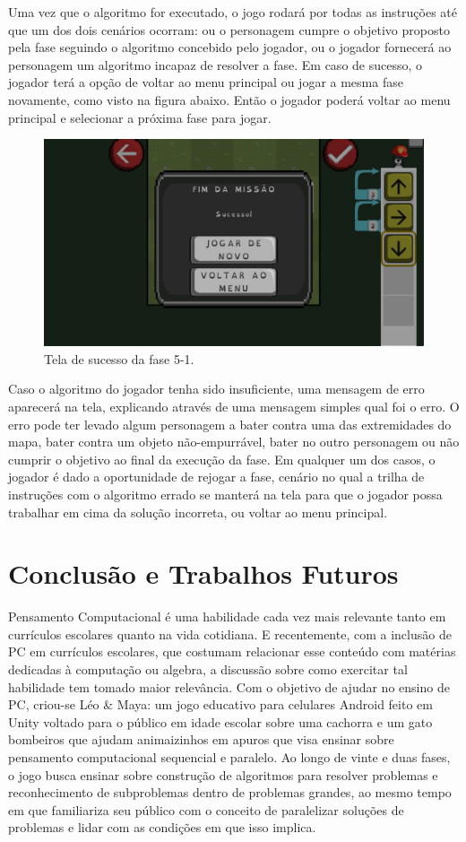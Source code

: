 \documentclass[conference]{IEEEtran}
\begin{document}
Uma vez que o algoritmo for executado, o jogo rodará por todas as instruções até que um dos dois cenários ocorram: ou o personagem cumpre o objetivo proposto pela fase seguindo o algoritmo concebido pelo jogador, ou o jogador fornecerá ao personagem um algoritmo incapaz de resolver a fase. Em caso de sucesso, o jogador terá a opção de voltar ao menu principal ou jogar a mesma fase novamente, como visto na figura abaixo. Então o jogador poderá voltar ao menu principal e selecionar a próxima fase para jogar.
\begin{figure}[htbp]
\centerline{\includegraphics[scale=0.275]{images/fig03.jpg}}
\caption{Tela de sucesso da fase 5-1.}
\label{fig}
\end{figure}

Caso o algoritmo do jogador tenha sido insuficiente, uma mensagem de erro aparecerá na tela, explicando através de uma mensagem simples qual foi o erro. O erro pode ter levado algum personagem a bater contra uma das extremidades do mapa, bater contra um objeto não-empurrável, bater no outro personagem ou não cumprir o objetivo ao final da execução da fase. Em qualquer um dos casos, o jogador é dado a oportunidade de rejogar a fase, cenário no qual a trilha de instruções com o algoritmo errado se manterá na tela para que o jogador possa trabalhar em cima da solução incorreta, ou voltar ao menu principal.


\section{Conclusão e Trabalhos Futuros}

Pensamento Computacional é uma habilidade cada vez mais relevante tanto em currículos escolares quanto na vida cotidiana. E recentemente, com a inclusão de PC em currículos escolares, que costumam relacionar esse conteúdo com matérias dedicadas à computação ou algebra, a discussão sobre como exercitar tal habilidade tem tomado maior relevância. Com o objetivo de ajudar no ensino de PC, criou-se Léo \& Maya: um jogo educativo para celulares Android feito em Unity voltado para o público em idade escolar sobre uma cachorra e um gato bombeiros que ajudam animaizinhos em apuros que visa ensinar sobre pensamento computacional sequencial e paralelo. Ao longo de vinte e duas fases, o jogo busca ensinar sobre construção de algoritmos para resolver problemas e reconhecimento de subproblemas dentro de problemas grandes, ao mesmo tempo em que familiariza seu público com o conceito de paralelizar soluções de problemas e lidar com as condições em que isso implica. 
\end{document}
